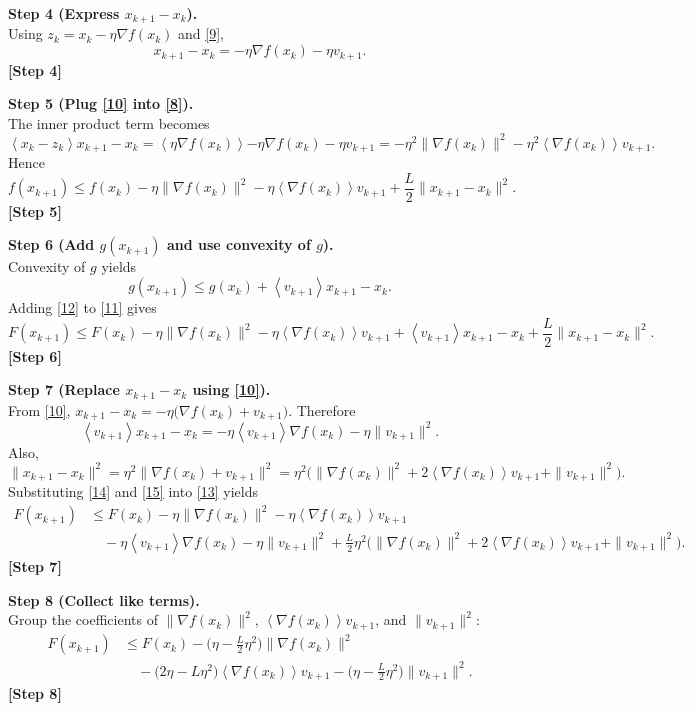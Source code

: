 \documentclass{article}
\newcommand{\grad}{\nabla}
\newcommand{\inner}[1]{\left\langle#1\right\rangle}
\begin{document}
\noindent\textbf{Step 4 (Express $x_{k+1}-x_{k}$).}\\
Using $z_{k}=x_{k}-\eta\grad f(x_{k})$ and \eqref{9},
\[
x_{k+1}-x_{k}= -\eta\grad f(x_{k}) -\eta v_{k+1}.
\tag{10}
\]
\textbf{[Step 4]}

\noindent\textbf{Step 5 (Plug \eqref{10} into \eqref{8}).}\\
The inner product term becomes
\[
\inner{x_{k}-z_{k}}{x_{k+1}-x_{k}}
= \inner{\eta\grad f(x_{k})}{-\eta\grad f(x_{k})-\eta v_{k+1}}
= -\eta^{2}\|\grad f(x_{k})\|^{2}-\eta^{2}\inner{\grad f(x_{k})}{v_{k+1}} .
\]
Hence
\[
f(x_{k+1})\le f(x_{k}) -\eta\|\grad f(x_{k})\|^{2}
-\eta\inner{\grad f(x_{k})}{v_{k+1}}
+\frac{L}{2}\|x_{k+1}-x_{k}\|^{2}.
\tag{11}
\]
\textbf{[Step 5]}

\noindent\textbf{Step 6 (Add $g(x_{k+1})$ and use convexity of $g$).}\\
Convexity of $g$ yields
\[
g(x_{k+1})\le g(x_{k})+\inner{v_{k+1}}{x_{k+1}-x_{k}} .
\tag{12}
\]
Adding \eqref{12} to \eqref{11} gives
\[
F(x_{k+1})\le F(x_{k}) -\eta\|\grad f(x_{k})\|^{2}
-\eta\inner{\grad f(x_{k})}{v_{k+1}}
+\inner{v_{k+1}}{x_{k+1}-x_{k}}
+\frac{L}{2}\|x_{k+1}-x_{k}\|^{2}.
\tag{13}
\]
\textbf{[Step 6]}

\noindent\textbf{Step 7 (Replace $x_{k+1}-x_{k}$ using \eqref{10}).}\\
From \eqref{10}, $x_{k+1}-x_{k}= -\eta\bigl(\grad f(x_{k})+v_{k+1}\bigr)$. Therefore
\[
\inner{v_{k+1}}{x_{k+1}-x_{k}}
= -\eta\inner{v_{k+1}}{\grad f(x_{k})}
-\eta\|v_{k+1}\|^{2}.
\tag{14}
\]
Also,
\[
\|x_{k+1}-x_{k}\|^{2}= \eta^{2}\|\grad f(x_{k})+v_{k+1}\|^{2}
= \eta^{2}\bigl(\|\grad f(x_{k})\|^{2}+2\inner{\grad f(x_{k})}{v_{k+1}}+\|v_{k+1}\|^{2}\bigr).
\tag{15}
\]
Substituting \eqref{14} and \eqref{15} into \eqref{13} yields
\[
\begin{aligned}
F(x_{k+1})
&\le F(x_{k})
-\eta\|\grad f(x_{k})\|^{2}
-\eta\inner{\grad f(x_{k})}{v_{k+1}}  \\
&\quad -\eta\inner{v_{k+1}}{\grad f(x_{k})}
-\eta\|v_{k+1}\|^{2}
+\frac{L}{2}\eta^{2}\bigl(\|\grad f(x_{k})\|^{2}+2\inner{\grad f(x_{k})}{v_{k+1}}+\|v_{k+1}\|^{2}\bigr).
\end{aligned}
\tag{16}
\]
\textbf{[Step 7]}

\noindent\textbf{Step 8 (Collect like terms).}\\
Group the coefficients of $\|\grad f(x_{k})\|^{2}$, $\inner{\grad f(x_{k})}{v_{k+1}}$, and $\|v_{k+1}\|^{2}$:
\[
\begin{aligned}
F(x_{k+1})
&\le F(x_{k})
-\bigl(\eta-\tfrac{L}{2}\eta^{2}\bigr)\|\grad f(x_{k})\|^{2} \\
&\quad -\bigl(2\eta-\!L\eta^{2}\bigr)\inner{\grad f(x_{k})}{v_{k+1}}
-\bigl(\eta-\tfrac{L}{2}\eta^{2}\bigr)\|v_{k+1}\|^{2}.
\end{aligned}
\tag{17}
\]
\textbf{[Step 8]}
\end{document}

